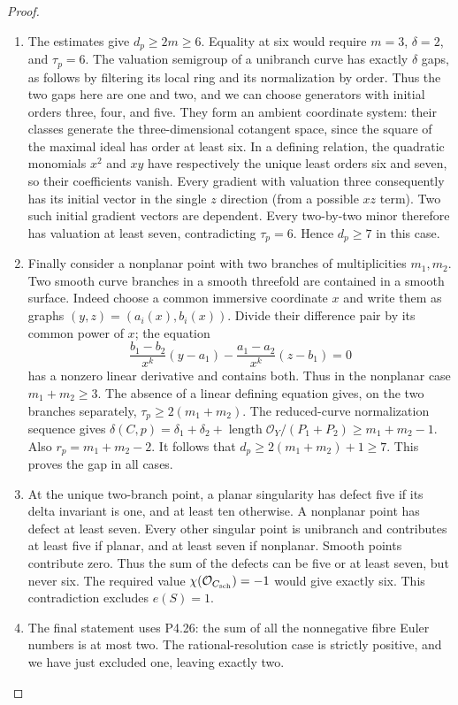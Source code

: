 \begin{proof}
\begin{enumerate}[label={$\langle1\rangle$\arabic*.},leftmargin=*]
\item The estimates give $d_p\ge2m\ge6$. Equality at six
would require $m=3$, $\delta=2$, and $\tau_p=6$.
The valuation semigroup of a unibranch curve has exactly
$\delta$ gaps, as follows by filtering its local ring
and its normalization by order. Thus the two gaps here
are one and two, and we can choose generators with
initial orders three, four, and five. They form an
ambient coordinate system: their classes generate the
three-dimensional cotangent space, since the square
of the maximal ideal has order at least six.
In a defining relation, the quadratic monomials
$x^2$ and $xy$ have respectively the unique least
orders six and seven, so their coefficients vanish.
Every gradient with valuation three consequently has
its initial vector in the single $z$ direction
(from a possible $xz$ term). Two such initial
gradient vectors are dependent. Every two-by-two
minor therefore has valuation at least seven,
contradicting $\tau_p=6$. Hence $d_p\ge7$ in this case.

\item Finally consider a nonplanar point with two branches
of multiplicities $m_1,m_2$. Two smooth curve branches
in a smooth threefold are contained in a smooth
surface. Indeed choose a common immersive coordinate
$x$ and write them as graphs
$(y,z)=(a_i(x),b_i(x))$. Divide their difference pair
by its common power of $x$; the equation
\[
 \frac{b_1-b_2}{x^k}(y-a_1)
 -\frac{a_1-a_2}{x^k}(z-b_1)=0
\]
has a nonzero linear derivative and contains both.
Thus in the nonplanar case $m_1+m_2\ge3$.
The absence of a linear defining equation gives,
on the two branches separately,
$\tau_p\ge2(m_1+m_2)$.
The reduced-curve normalization sequence gives
$\delta(C,p)=\delta_1+\delta_2+
\operatorname{length}\mathcal O_Y/(P_1+P_2)
\ge m_1+m_2-1$.
Also $r_p=m_1+m_2-2$.
It follows that
$d_p\ge2(m_1+m_2)+1\ge7$.
This proves the gap in all cases.

\item At the unique two-branch point, a planar singularity
has defect five if its delta invariant is one, and
at least ten otherwise. A nonplanar point has defect
at least seven. Every other singular point is
unibranch and contributes at least five if planar,
and at least seven if nonplanar. Smooth points
contribute zero. Thus the sum of the defects can
be five or at least seven, but never six.
The required value $\chi(\mathcal O_{C_{\rm sch}})=-1$
would give exactly six. This contradiction excludes
$e(S)=1$.

\item The final statement uses P4.26: the sum of all the
nonnegative fibre Euler numbers is at most two.
The rational-resolution case is strictly positive,
and we have just excluded one, leaving exactly two.

\end{enumerate}
\end{proof}
